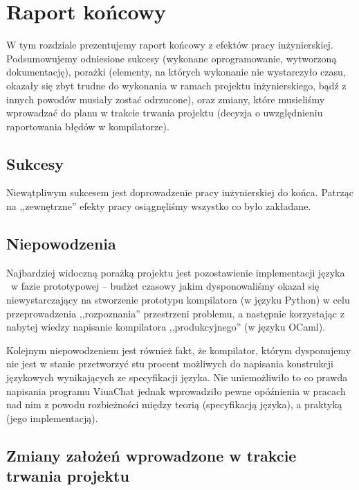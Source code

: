 \chapter{Raport końcowy}
\label{raport_koncowy}

W tym rozdziale prezentujemy raport końcowy z efektów pracy inżynierskiej.
Podsumowujemy odniesione sukcesy (wykonane oprogramowanie, wytworzoną dokumentację), porażki (elementy, na
których wykonanie nie wystarczyło czasu, okazały się zbyt trudne do wykonania w ramach projektu
inżynierskiego, bądź z innych powodów musiały zostać odrzucone), oraz zmiany, które musieliśmy wprowadzać do
planu w trakcie trwania projektu (decyzja o uwzględnieniu raportowania błędów w kompilatorze).

\section{Sukcesy}

Niewątpliwym sukcesem jest doprowadzenie pracy inżynierskiej do końca. Patrząc
na ,,zewnętrzne'' efekty pracy osiągnęliśmy wszystko co było zakładane.

\section{Niepowodzenia}

Najbardziej widoczną porażką projektu jest pozostawienie implementacji języka
\ViuAct\ w fazie prototypowej -- budżet czasowy jakim dysponowaliśmy okazał się
niewystarczający na stworzenie prototypu kompilatora (w języku Python) w celu
przeprowadzenia ,,rozpoznania'' przestrzeni problemu, a następnie korzystając z
nabytej wiedzy napisanie kompilatora ,,produkcyjnego'' (w języku OCaml).

Kolejnym niepowodzeniem jest również fakt, że kompilator, którym dysponujemy nie
jest w stanie przetworzyć stu procent możliwych do napisania konstrukcji
językowych wynikających ze specyfikacji języka. Nie uniemożliwiło to co prawda
napisania programu ViuaChat jednak wprowadziło pewne opóźnienia w pracach nad
nim z powodu rozbieżności między teorią (specyfikacją języka), a praktyką (jego
implementacją).


\section{Zmiany założeń wprowadzone w trakcie trwania projektu}

